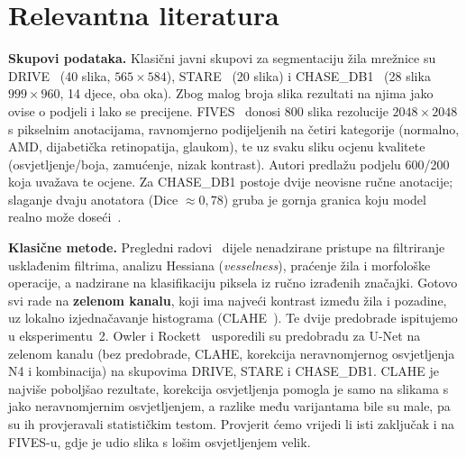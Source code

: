 \section{Relevantna literatura}
\label{sec:lit}

\textbf{Skupovi podataka.} Klasični javni skupovi za segmentaciju žila mrežnice su DRIVE~\cite{staal2004} (40 slika, $565\times584$), STARE~\cite{hoover2000} (20 slika) i CHASE\_DB1~\cite{fraz2012ens} (28 slika $999\times960$, 14 djece, oba oka). Zbog malog broja slika rezultati na njima jako ovise o podjeli i lako se precijene. FIVES~\cite{jin2022fives} donosi 800 slika rezolucije $2048\times2048$ s pikselnim anotacijama, ravnomjerno podijeljenih na četiri kategorije (normalno, AMD, dijabetička retinopatija, glaukom), te uz svaku sliku ocjenu kvalitete (osvjetljenje/boja, zamućenje, nizak kontrast). Autori predlažu podjelu 600/200 koja uvažava te ocjene. Za CHASE\_DB1 postoje dvije neovisne ručne anotacije; slaganje dvaju anotatora (Dice $\approx0{,}78$) gruba je gornja granica koju model realno može doseći~\cite{fraz2012ens}.

\textbf{Klasične metode.} Pregledni radovi~\cite{fraz2012survey,moccia2018} dijele nenadzirane pristupe na filtriranje usklađenim filtrima, analizu Hessiana (\emph{vesselness}), praćenje žila i morfološke operacije, a nadzirane na klasifikaciju piksela iz ručno izrađenih značajki. Gotovo svi rade na \textbf{zelenom kanalu}, koji ima najveći kontrast između žila i pozadine, uz lokalno izjednačavanje histograma (CLAHE~\cite{zuiderveld1994}). Te dvije predobrade ispitujemo u eksperimentu~2. Owler i Rockett~\cite{owler2021} usporedili su predobradu za U-Net na zelenom kanalu (bez predobrade, CLAHE, korekcija neravnomjernog osvjetljenja N4 i kombinacija) na skupovima DRIVE, STARE i CHASE\_DB1. CLAHE je najviše poboljšao rezultate, korekcija osvjetljenja pomogla je samo na slikama s jako neravnomjernim osvjetljenjem, a razlike među varijantama bile su male, pa su ih provjeravali statističkim testom. Provjerit ćemo vrijedi li isti zaključak i na FIVES-u, gdje je udio slika s lošim osvjetljenjem velik.


